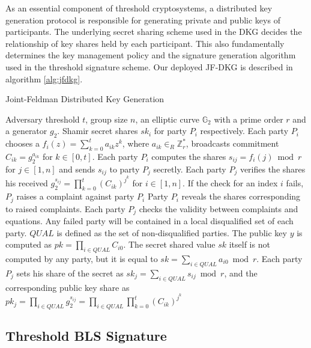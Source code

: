 \documentclass[11pt]{article}
\begin{document}
As an essential component of threshold cryptosystems, a distributed key generation protocol is responsible for generating private and public keys of participants. The underlying secret sharing scheme used in the DKG decides the relationship of key shares held by each participant. This also fundamentally determines the key management policy and the signature generation algorithm used in the threshold signature scheme. Our deployed JF-DKG is described in algorithm \ref{alg:jfdkg}.

\begin{algorithm}
\caption{Joint-Feldman Distributed Key Generation \cite{gennaro2007secure}}\label{alg:jfdkg}
\begin{algorithmic}[1]
\Require Adversary threshold $t$, group size $n$, an elliptic curve $\mathbb{G}_2$ with a prime order $r$ and a generator $g_2$.
\Ensure Shamir secret shares $sk_i$ for party $P_i$ respectively.
\State Each party $P_i$ chooses a $f_i(z) = \sum_{k=0}^t a_{ik}z^{k}$, where $a_{ik} \in_R \mathbb{Z}_r^*$, broadcasts commitment $C_{ik} = g_2^{a_{ik}}$ for $k \in [0,t]$. Each party $P_i$ computes the shares $s_{ij} = f_i(j) \bmod r$ for $j \in [1,n]$ and sends $s_{ij}$ to party $P_j$ secretly.
\State Each party $P_j$ verifies the shares his received $g_2^{s_{ij}} = \prod_{k=0}^t(C_{ik})^{j^k}$ for $i \in [1,n]$. If the check for an index $i$ fails, $P_j$ raises a complaint against party $P_i$
\State Party $P_i$ reveals the shares corresponding to raised complaints. Each party $P_j$ checks the validity between complaints and equations. Any failed party will be contained in a local disqualified set of each party. $QUAL$ is defined as the set of non-disqualified parties.
\State The public key $y$ is computed as $pk = \prod_{i\in QUAL} C_{i0}$. The secret shared value $sk$ itself is not computed by any party, but it is equal to $sk = \sum_{i \in QUAL} a_{i0} \bmod r$. Each party $P_j$ sets his share of the secret as $sk_j = \sum_{i\in QUAL} s_{ij} \bmod r$, and the corresponding public key share as $pk_j = \prod_{i \in QUAL} g_2^{s_{ij}} = \prod_{i \in QUAL} \prod_{k=0}^t (C_{ik})^{j^k}$
\end{algorithmic}
\end{algorithm}

\subsection{Threshold BLS Signature}
\end{document}
